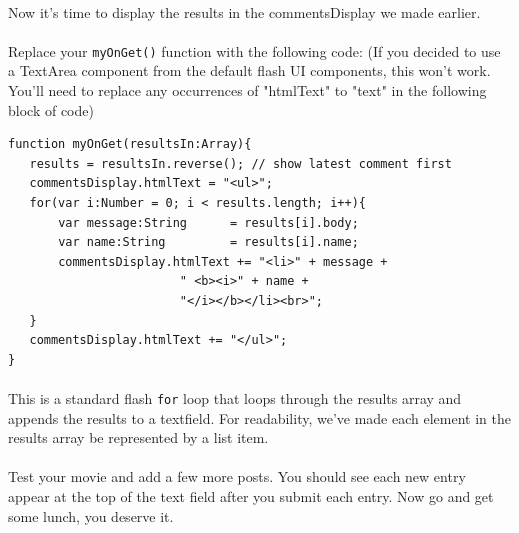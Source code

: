\documentclass[12pt]{report}
\begin{document}
\paragraph{}
Now it's time to display the results in the commentsDisplay we  made earlier.

\paragraph{}
Replace your \texttt{myOnGet()} function with the following code: (If
you decided to use a TextArea component from the default flash UI
components, this won't work. You'll need to replace any occurrences of
"htmlText" to "text" in the following block of code)

\begin{Verbatim}[frame=single]
function myOnGet(resultsIn:Array){
   results = resultsIn.reverse(); // show latest comment first
   commentsDisplay.htmlText = "<ul>";
   for(var i:Number = 0; i < results.length; i++){
       var message:String      = results[i].body;
       var name:String         = results[i].name;
       commentsDisplay.htmlText += "<li>" + message + 
                        " <b><i>" + name + 
                        "</i></b></li><br>";
   }
   commentsDisplay.htmlText += "</ul>";
}
\end{Verbatim}

\paragraph{}
This is a standard flash \texttt{for} loop that loops through the
results array and appends the results to a textfield. For readability,
we've made each element in the results array be represented by a list
item.

\paragraph{}
Test your movie and add a few more posts. You should see each new
entry appear at the top of the text field after you submit each
entry. Now go and get some lunch, you deserve it.
\end{document}
